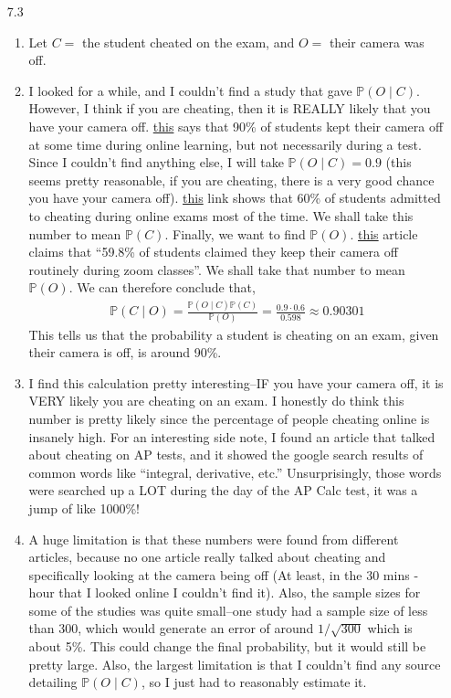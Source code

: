\documentclass[12pt]{article}
\renewcommand{\P}{\mathbb{P}}
\theoremstyle{definition}
\theoremstyle{remark}
\begin{document}
\begin{enumerate}[leftmargin=\labelsep]
		\item[7.3]
		\begin{enumerate}
			\item Let $C=$ the student cheated on the exam, and $O=$ their camera was off.
			\item I looked for a while, and I couldn't find a study that gave $\P(O \mid C)$. However, I think if you are cheating, then it is REALLY likely that you have your camera off. \href{https://onlinelibrary.wiley.com/doi/full/10.1002/ece3.7123#:~:text=The%20vast%20majority%20of%20students,several%20reasons%20for%20doing%20so.}{this} says that 90\% of students kept their camera off at some time during online learning, but not necessarily during a test. Since I couldn't find anything else, I will take $\P(O \mid C) = 0.9$ (this seems pretty reasonable, if you are cheating, there is a very good chance you have your camera off). \href{https://www.ncbi.nlm.nih.gov/pmc/articles/PMC10019462/}{this} link shows that 60\% of students admitted to cheating during online exams most of the time. We shall take this number to mean $\P(C)$. Finally, we want to find $\P(O)$. \href{https://chsktr.com/2876/entertainment/cameras-off/}{this} article claims that ``59.8\% of students claimed they keep their camera off routinely during zoom classes''. We shall take that number to mean $\P(O)$. We can therefore conclude that,
			\begin{align*}
				\P(C \mid O) = \frac{\P(O \mid C) \P(C)}{\P(O)} = \frac{0.9 \cdot 0.6}{0.598} \approx 0.90301
			\end{align*}
			This tells us that the probability a student is cheating on an exam, given their camera is off, is around 90\%.
			
			
			\item I find this calculation pretty interesting--IF you have your camera off, it is VERY likely you are cheating on an exam. I honestly do think this number is pretty likely since the percentage of people cheating online is insanely high. For an interesting side note, I found an article that talked about cheating on AP tests, and it showed the google search results of common words like ``integral, derivative, etc.'' Unsurprisingly, those words were searched up a LOT during the day of the AP Calc test, it was a jump of like 1000\%! 
			
			\item A huge limitation is that these numbers were found from different articles, because no one article really talked about cheating and specifically looking at the camera being off (At least, in the 30 mins - hour that I looked online I couldn't find it). Also, the sample sizes for some of the studies was quite small--one study had a sample size of less than 300, which would generate an error of around $1/\sqrt{300}$ which is about 5\%. This could change the final probability, but it would still be pretty large. Also, the largest limitation is that I couldn't find any source detailing $\P(O \mid C)$, so I just had to reasonably estimate it.
		\end{enumerate}
	\end{enumerate}
\end{document}
